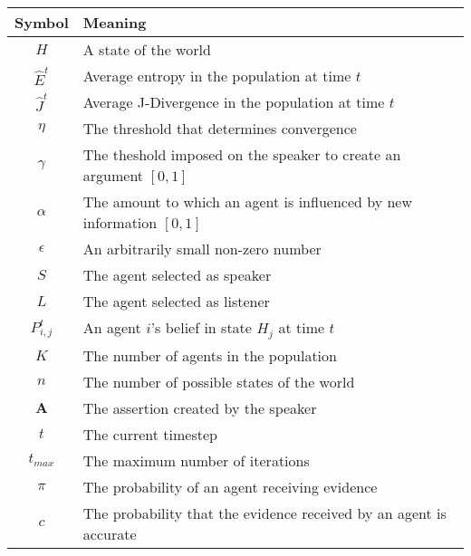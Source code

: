 \begin{table}[H]
\begin{tabular}{c|l}
Symbol & Meaning \\ \hline
$H$ & A state of the world \\
$\hat{E}^t$ & Average entropy in the population at time $t$ \\
$\hat{J}^t$ & Average J-Divergence in the population at time $t$ \\
$\eta$ & The threshold that determines convergence \\
$\gamma$ & The theshold imposed on the speaker to create an argument $[0,1]$ \\
$\alpha$ & The amount to which an agent is influenced by new information $[0,1]$ \\
$\epsilon$ & An arbitrarily small non-zero number \\
$S$ & The agent selected as speaker \\
$L$ & The agent selected as listener \\
$P_{i,j}^t$ & An agent $i$'s belief in state $H_j$ at time $t$ \\
$K$ & The number of agents in the population \\
$n$ & The number of possible states of the world \\
$\mathbf{A}$ & The assertion created by the speaker \\
$t$ & The current timestep \\
$t_{max}$ & The maximum number of iterations \\
$\pi$ & The probability of an agent receiving evidence \\
$c$ & The probability that the evidence received by an agent is accurate\\
\end{tabular}
\end{table}